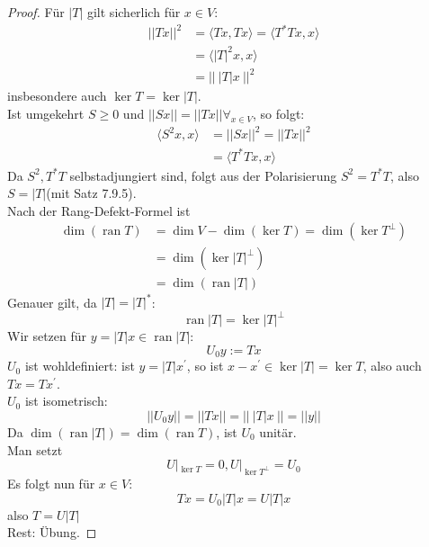 \documentclass[12pt,a4paper]{article}
\theoremstyle{definition}
\theoremstyle{remark}
\DeclareMathOperator{\ran}{ran}
\begin{document}
	\begin{proof}
		Für $|T|$ gilt sicherlich für $x \in V$:
		\begin{equation}
			\begin{split}
				||Tx||^2&=  \langle Tx, Tx \rangle = \langle T^*Tx,x \rangle \\
				&= \langle |T|^2x,x \rangle \\
				&= || \ |T|x \ ||^2
			\end{split}
		\end{equation}
		insbesondere auch $\ker T = \ker |T|$. \\
		Ist umgekehrt $S \geq 0$ und $||Sx||=||Tx|| \forall_{x \in V}$, so folgt:
		\begin{equation}
			\begin{split}
				\langle S^2x,x \rangle &= ||Sx||^2 = ||Tx||^2 \\
				&= \langle T^*Tx,x \rangle
			\end{split}
		\end{equation}
		Da $S^2,T^*T$ selbstadjungiert sind, folgt aus der Polarisierung $S^2=T^*T$, also $S = |T|$(mit Satz 7.9.5). \\
		Nach der Rang-Defekt-Formel ist 
		\begin{equation}
			\begin{split}
				\dim (\ran T) &= \dim V-\dim (\ker T) = \dim (\ker T^{\bot}) \\
				&= \dim (\ker |T|^{\bot}) \\
				&= \dim(\ran |T|)
			\end{split}
		\end{equation}
		Genauer gilt, da $|T|=|T|^*$: 
		\begin{equation}
			\ran |T| = \ker |T|^{\bot}
		\end{equation}
		Wir setzen für $y = |T|x \in \ran |T|$:
		\begin{equation}
			U_0y:=Tx
		\end{equation}
		$U_0$ ist wohldefiniert: ist $y = |T|x^{'}$, so ist $x-x^{'} \in \ker |T|=\ker T$, also auch $Tx = Tx^{'}$. \\
		$U_0$ ist isometrisch:
		\begin{equation}
			||U_0y||=||Tx|| = || \ |T|x \ || = ||y||
		\end{equation}
		Da $\dim (\ran |T|)=\dim (\ran T)$, ist $U_0$ unitär. \\
		Man setzt
		\begin{equation}
			U|_{\ker T}=0, U|_{\ker T^{\bot}}=U_0
		\end{equation}
		Es folgt nun für $x \in V$:
		\begin{equation}
			Tx = U_0|T|x=U|T|x
		\end{equation}
		also $T = U|T|$ \\		
		Rest: Übung.
	\end{proof}
	\newpage
\end{document}
